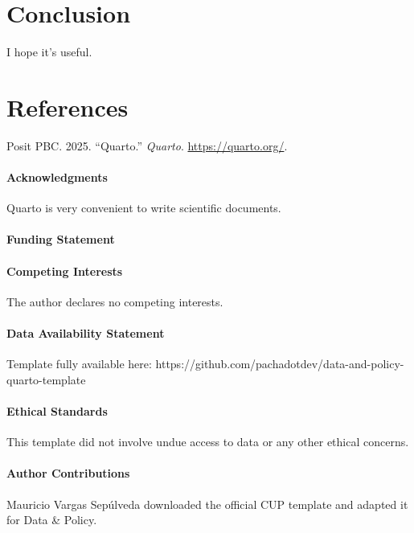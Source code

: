\documentclass{latex/CUP-JNL-DAP}%
\newlength{\cslhangindent}
\newenvironment{CSLReferences}[2] %
 {\begin{list}{}{%
  \setlength{\itemindent}{0pt}
  \setlength{\leftmargin}{0pt}
  \setlength{\parsep}{0pt}
  \ifodd #1
   \setlength{\leftmargin}{\cslhangindent}
   \setlength{\itemindent}{-1\cslhangindent}
  \fi
  \setlength{\itemsep}{#2\baselineskip}}}
 {\end{list}}
\begin{document}
\section{Conclusion}\label{conclusion}

I hope it's useful.

\section*{References}\label{references}

\label{refs}
\begin{CSLReferences}{1}{0}
Posit PBC. 2025. {``Quarto.''} \emph{Quarto}. \url{https://quarto.org/}.

\end{CSLReferences}

\begin{Backmatter}

\paragraph{Acknowledgments}
Quarto is very convenient to write scientific documents.

\paragraph{Funding Statement}


\paragraph{Competing Interests}
The author declares no competing interests.

\paragraph{Data Availability Statement}
Template fully available here:
https://github.com/pachadotdev/data-and-policy-quarto-template

\paragraph{Ethical Standards}
This template did not involve undue access to data or any other ethical
concerns.

\paragraph{Author Contributions}
Mauricio Vargas Sepúlveda downloaded the official CUP template and
adapted it for Data \& Policy.



% 


\end{Backmatter}
\end{document}
